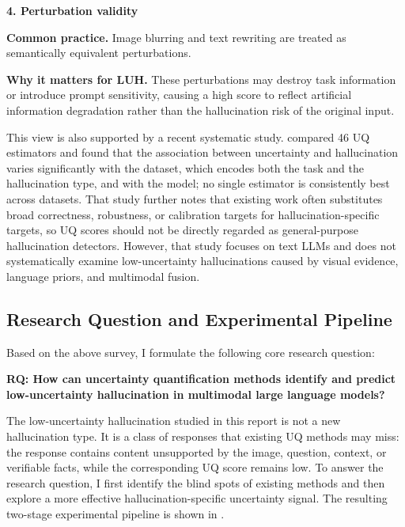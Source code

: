 \begin{gapblock}
\textbf{4. Perturbation validity}\par\smallskip
\textbf{Common practice.} Image blurring and text rewriting are treated as semantically equivalent perturbations.\par
\textbf{Why it matters for LUH.} These perturbations may destroy task information or introduce prompt sensitivity, causing a high score to reflect artificial information degradation rather than the hallucination risk of the original input.
\end{gapblock}

This view is also supported by a recent systematic study. \citet{agnimo2026evaluating} compared 46 UQ estimators and found that the association between uncertainty and hallucination varies significantly with the dataset, which encodes both the task and the hallucination type, and with the model; no single estimator is consistently best across datasets. That study further notes that existing work often substitutes broad correctness, robustness, or calibration targets for hallucination-specific targets, so UQ scores should not be directly regarded as general-purpose hallucination detectors. However, that study focuses on text LLMs and does not systematically examine low-uncertainty hallucinations caused by visual evidence, language priors, and multimodal fusion.

\subsection{Research Question and Experimental Pipeline}
\label{subsec:research_question}
\label{subsec:pipeline}

Based on the above survey, I formulate the following core research question:

\begin{gapblock}
\textbf{RQ: How can uncertainty quantification methods identify and predict low-uncertainty hallucination in multimodal large language models?}
\end{gapblock}

The low-uncertainty hallucination studied in this report is not a new hallucination type. It is a class of responses that existing UQ methods may miss: the response contains content unsupported by the image, question, context, or verifiable facts, while the corresponding UQ score remains low. To answer the research question, I first identify the blind spots of existing methods and then explore a more effective hallucination-specific uncertainty signal. The resulting two-stage experimental pipeline is shown in .

